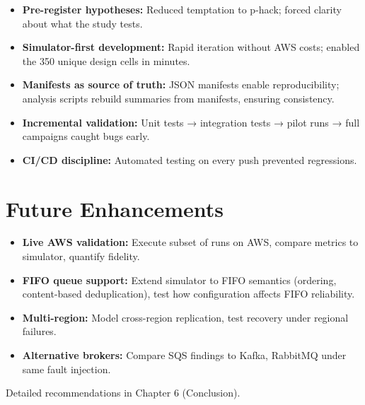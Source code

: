\begin{itemize}
    \item \textbf{Pre-register hypotheses:} Reduced temptation to p-hack; forced clarity about what the study tests.
    \item \textbf{Simulator-first development:} Rapid iteration without AWS costs; enabled the 350 unique design cells in minutes.
    \item \textbf{Manifests as source of truth:} JSON manifests enable reproducibility; analysis scripts rebuild summaries from manifests, ensuring consistency.
    \item \textbf{Incremental validation:} Unit tests → integration tests → pilot runs → full campaigns caught bugs early.
    \item \textbf{CI/CD discipline:} Automated testing on every push prevented regressions.
\end{itemize}

\section{Future Enhancements}

\begin{itemize}
    \item \textbf{Live AWS validation:} Execute subset of runs on AWS, compare metrics to simulator, quantify fidelity.
    \item \textbf{FIFO queue support:} Extend simulator to FIFO semantics (ordering, content-based deduplication), test how configuration affects FIFO reliability.
    \item \textbf{Multi-region:} Model cross-region replication, test recovery under regional failures.
    \item \textbf{Alternative brokers:} Compare SQS findings to Kafka, RabbitMQ under same fault injection.
\end{itemize}

Detailed recommendations in Chapter 6 (Conclusion).
